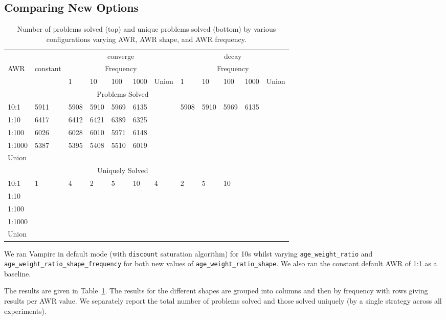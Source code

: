 \documentclass{llncs}
\begin{document}
\subsection{Comparing New Options}


\begin{table}[t]
\caption{Number of problems solved (top) and unique problems solved (bottom) by various configurations varying AWR, AWR shape, and AWR frequency.\label{tab:short:runs}}
\centering
\begin{tabular}{l|l|lllll|lllll}
&&  \multicolumn{5}{|c}{converge} &  \multicolumn{5}{|c}{decay} \\  
AWR & constant & \multicolumn{5}{|c|}{Frequency}  & \multicolumn{5}{|c}{Frequency} \\  
&& 1 & 10 & 100 & 1000 & Union & 1 & 10 & 100 & 1000 &Union  \\ \hline
\multicolumn{10}{c}{Problems Solved} \\ \hline
10:1		&5911 & 5908&5910 & 5969 &6135 &  & 5908 &5910  & 5969  &6135  \\
1:10		&6417& 6412&6421 &6389 & 6325  \\
1:100	&6026& 6028& 6010& 5971& 6148\\
1:1000	&5387&5395  &5408 &5510 &6019  \\ \hline
Union & \\ \hline \hline
\multicolumn{10}{c}{Uniquely Solved} \\ \hline
10:1		&1 & 4&2 & 5 &10 & 4&2 & 5&10 \\
1:10		& \\
1:100	& \\
1:1000	&\\ \hline
Union & \\ 
\end{tabular}
\end{table}

We ran Vampire in default mode (with {\tt discount} saturation algorithm) for 10s whilst varying  \texttt{age\_weight\_ratio} and \texttt{age\_weight\_ratio\_shape\_frequency} for both new values of \texttt{age\_weight\_ratio\_shape}. We also ran the constant default AWR of 1:1 as a baseline. 

The results are given in Table~\ref{tab:short:runs}. The results for the different shapes are grouped into columns and then by frequency with rows giving results per AWR value. We separately report the total number of problems solved and those solved uniquely (by a single strategy across all experiments).
\end{document}

